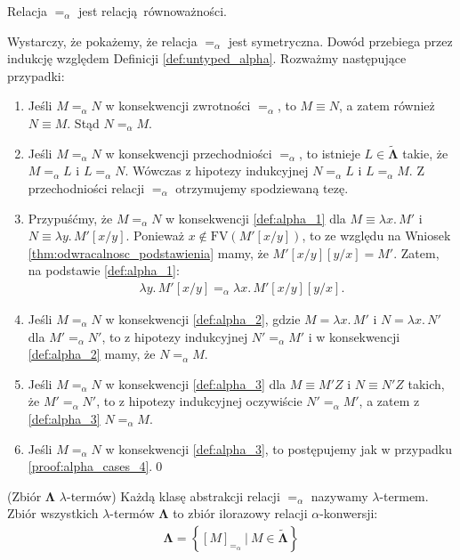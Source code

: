 \begin{wniosek}
  Relacja \(=_{\alpha}\) jest relacją równoważności.
  \begin{dowod}
    Wystarczy, że pokażemy, że relacja \(=_{\alpha}\) jest symetryczna. Dowód przebiega przez indukcję względem Definicji \ref{def:untyped_alpha}. Rozważmy następujące przypadki:

    \begin{enumerate}[label={\roman*)}, ref={(\roman*)}]
      \item Jeśli \(M=_{\alpha} N\) w konsekwencji zwrotności \(=_{\alpha}\), to \(M\equiv N\), a zatem również \(N\equiv M\). Stąd \(N=_{\alpha} M\).
      \item Jeśli \(M=_{\alpha} N\) w konsekwencji przechodniości \(=_{\alpha}\), to istnieje \(L\in\mathbf{\tilde\Lambda}\) takie, że \(M=_{\alpha}L\) i \(L=_{\alpha}N\). Wówczas z hipotezy indukcyjnej \(N=_{\alpha}L\) i \(L=_{\alpha}M\). Z przechodniości relacji \(=_{\alpha}\) otrzymujemy spodziewaną tezę.
      \item Przypuśćmy, że \(M=_{\alpha} N\) w konsekwencji  \ref{def:alpha_1}  dla \(M\equiv\lambda x.\,M'\) i \(N\equiv\lambda y.\,M'[x/y]\). Ponieważ \(x\not\in\mathrm{FV}(M'[x/y])\), to ze względu na Wniosek \ref{thm:odwracalnosc_podstawienia} mamy, że \(M'[x/y][y/x]=M'\). Zatem, na podstawie \ref{def:alpha_1}:
  \begin{align*}
        \lambda y.\,M'[x/y] =_{\alpha} \lambda x.\,M'[x/y][y/x].
      \end{align*}
    \item  Jeśli \(M=_{\alpha} N\) w konsekwencji \ref{def:alpha_2}, gdzie \(M=\lambda x.\,M'\) i \(N=\lambda x.\,N'\) dla \(M'=_{\alpha} N'\), to z hipotezy indukcyjnej \(N' =_{\alpha} M'\) i w konsekwencji \ref{def:alpha_2} mamy, że \(N=_{\alpha} M\).
    \item  Jeśli \(M=_{\alpha} N\) w konsekwencji \ref{def:alpha_3} dla \(M\equiv M'Z\) i \(N\equiv N'Z\) takich, że \(M'=_{\alpha}N'\), to z hipotezy indukcyjnej oczywiście \(N'=_{\alpha}M'\), a zatem z \ref{def:alpha_3} \(N=_{\alpha} M\).\label{proof:alpha_cases_4}
    \item  Jeśli \(M=_{\alpha} N\) w konsekwencji \ref{def:alpha_3}, to postępujemy jak w przypadku \ref{proof:alpha_cases_4}.\qed
    \end{enumerate}
  \end{dowod}
\end{wniosek}

\begin{definicja}(Zbiór \(\mathbf{\Lambda}\) \(\lambda\)-termów)
  Każdą klasę abstrakcji relacji \(=_{\alpha}\) nazywamy \(\lambda\)-termem. Zbiór wszystkich \(\lambda\)-termów \(\mathbf{\Lambda}\) to zbiór ilorazowy relacji \(\alpha\)-konwersji:
  \begin{align*}
    \mathbf{\Lambda}=\left\{[M]_{=_\alpha}\ |\ M\in\mathbf{\tilde\Lambda}\right\}
  \end{align*}
\end{definicja}

